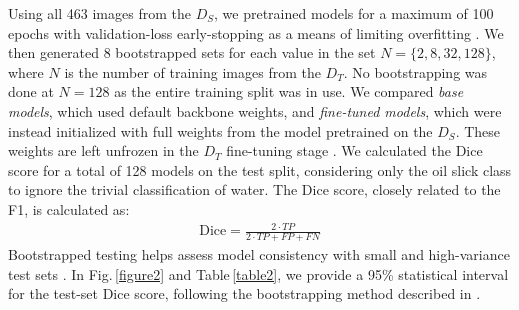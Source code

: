 \documentclass[lettersize,journal]{IEEEtran}
\begin{document}
Using all 463 images from the $\mathit{D}_S$, we pretrained models for a maximum of 100 epochs with validation-loss early-stopping as a means of limiting overfitting \cite{wangGeneralizingFewExamples2020}. 
We then generated 8 bootstrapped sets for each value in the set \( N = \{ 2, 8, 32, 128\} \), where \( N \) is the number of training images from the $\mathit{D}_T$. No bootstrapping was done at \( N = 128 \) 
as the entire training split was in use. We compared \textit{base models}, which used default backbone weights, and \textit{fine-tuned models}, which were instead initialized with full weights from the model 
pretrained on the $\mathit{D}_S$. These weights are left unfrozen in the $\mathit{D}_T$ fine-tuning stage \cite{yosinskiHowTransferableAre2014}. We calculated the Dice score for a total of 128 models on the test split, 
considering only the oil slick class to ignore the trivial classification of water. The Dice score, closely related to the F1, is calculated as:
\begin{align}
    \text{Dice} = \frac{2 \cdot TP}{2 \cdot TP + FP + FN}
\end{align}
Bootstrapped testing helps assess model consistency with small and high-variance test sets \cite{mollersenAccountingMultiplicityMachine2024}. In Fig.\,\ref{figure2} and Table\,\ref{table2},
we provide a 95\% statistical interval for the test-set Dice score, following the bootstrapping method described in
\cite{burkovMachineLearningEngineering2020}.
\end{document}

